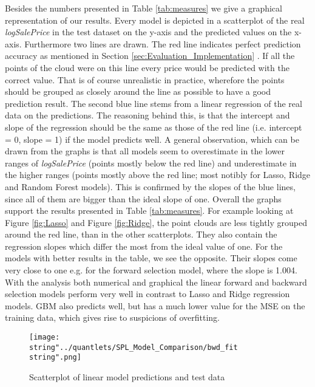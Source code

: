 Besides the numbers presented in Table \ref{tab:measures} we give a graphical representation of our results. Every model is depicted in a scatterplot of the real \textit{logSalePrice} in the test dataset on the y-axis and the predicted values on the x-axis. Furthermore two lines are drawn. The red line indicates perfect prediction accuracy as mentioned in Section \ref{sec:Evaluation_Implementation} . If all the points of the cloud were on this line every price would be predicted with the correct value. That is of course unrealistic in practice, wherefore the points should be grouped as closely around the line as possible to have a good prediction result. The second blue line stems from a linear regression of the real data on the predictions. The reasoning behind this, is that the intercept and slope of the regression should be the same as those of the red line (i.e. intercept = 0, slope = 1) if the model predicts well. A general observation, which can be drawn from the graphs is that all models seem to overestimate in the lower ranges of \textit{logSalePrice} (points mostly below the red line) and underestimate in the higher ranges (points mostly above the red line; most notibly for Lasso, Ridge and Random Forest models). This is confirmed by the slopes of the blue lines, since all of them are bigger than the ideal slope of one. Overall the graphs support the results presented in Table \ref{tab:measures}. For example looking at Figure \ref{fig:Lasso} and Figure \ref{fig:Ridge}, the point clouds are less tightly grouped around the red line, than in the other scatterplots. They also contain the regression slopes  which differ the most from the ideal value of one. For the models with better results in the table, we see the opposite. Their slopes come very close to one e.g. for the forward selection model, where the slope is 1.004. With the analysis both numerical and graphical the linear forward and backward selection models perform very well in contrast to Lasso and Ridge regression models. GBM also predicts well, but has  a much lower value for the MSE on the training data, which gives rise to suspicions of overfitting.  




\begin{figure}[H]
\centering
	\texttt{[image: \\string"../quantlets/SPL\_Model\_Comparison/bwd\_fit\\string".png]}
  	\caption{Scatterplot of linear model predictions and test data}
  	\label{fig:lm}
\end{figure}

